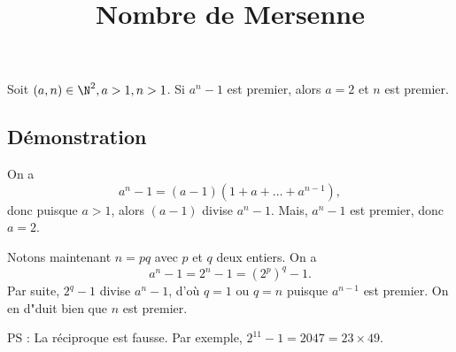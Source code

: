 \documentclass[fontsize=12pt,twoside=false,parskip=half, french]{scrartcl}
\title{Nombre de Mersenne}
\date{}
\author{}
\begin{document}
\maketitle
   \begin{Theoreme}
      Soit $(a, n) \in \N^2, a > 1, n > 1$. Si $a^n - 1$ est premier, alors $a = 2$
      et $n$ est premier.
   \end{Theoreme}
   \subsection{Démonstration}
      On a 
      \[
         a^n - 1 = (a - 1)(1 + a + \ldots + a^{n - 1}),
      \]
      donc puisque $a > 1$, alors $(a - 1)$ divise $a^n - 1$. Mais, $a^n - 1$
      est premier, donc $a = 2$.
      
      Notons maintenant $n = pq$ avec $p$ et $q$ deux entiers. On a
      \[
         a^n - 1 = 2^n - 1 = (2^p)^q - 1.
      \]
      Par suite, $2^q - 1$ divise $a^n -1$, d’où $q = 1$ ou $q = n$ puisque $a^{n - 1}$
      est premier. On en d"duit bien que $n$ est premier.
      
      PS : La réciproque est fausse. Par exemple, $2^11 - 1 = 2047 = 23 \times 49$.
\end{document}
